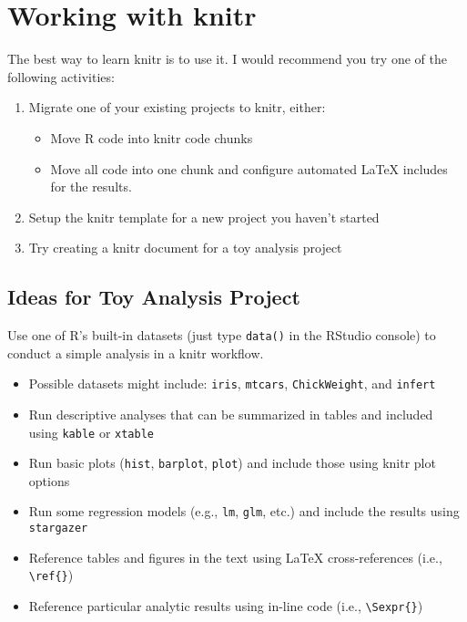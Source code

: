 \documentclass[11pt, a4paper]{article}
\begin{document}
\clearpage
\section*{Working with knitr}

The best way to learn knitr is to use it. I would recommend you try one of the following activities:

\begin{enumerate}
    \item Migrate one of your existing projects to knitr, either:
        \begin{itemize}
            \item Move R code into knitr code chunks
            \item Move all code into one chunk and configure automated \LaTeX{} includes for the results.
        \end{itemize}
    \item Setup the knitr template for a new project you haven't started
    \item Try creating a knitr document for a toy analysis project
\end{enumerate}

\vspace{1em}
\subsection*{Ideas for Toy Analysis Project}

Use one of R's built-in datasets (just type \texttt{data()} in the RStudio console) to conduct a simple analysis in a knitr workflow. 

\begin{itemize}
\item Possible datasets might include: \texttt{iris}, \texttt{mtcars}, \texttt{ChickWeight}, and \texttt{infert}
\item Run descriptive analyses that can be summarized in tables and included using \texttt{kable} or \texttt{xtable}
\item Run basic plots (\texttt{hist}, \texttt{barplot}, \texttt{plot}) and include those using knitr plot options
\item Run some regression models (e.g., \texttt{lm}, \texttt{glm}, etc.) and include the results using \texttt{stargazer}
\item Reference tables and figures in the text using \LaTeX{} cross-references (i.e., \verb|\ref{}|)
\item Reference particular analytic results using in-line code (i.e., \verb|\Sexpr{}|)
\end{itemize}
\end{document}
